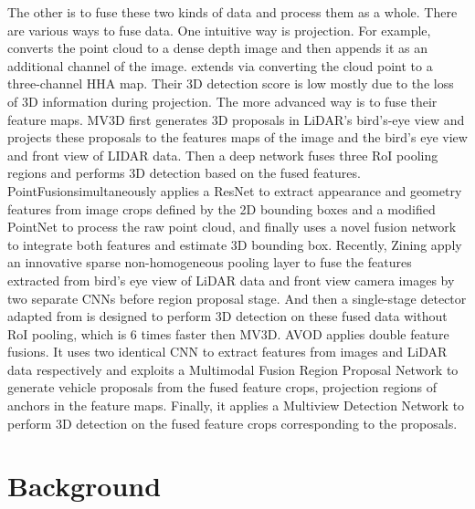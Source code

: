 \documentclass[a4paper,12pt]{article}
\begin{document}
The other is to fuse these two kinds of data and process them as a whole. There are various ways to fuse data. One intuitive way is projection. For example, \cite{DBLP:journals/corr/EitelSSRB15} converts the point cloud to a dense depth image and then appends it as an additional channel of the image. \cite{7487370} extends \cite{DBLP:journals/corr/EitelSSRB15} via converting the cloud point to a three-channel HHA map. Their 3D detection score is low mostly due to the loss of 3D information during projection. The more advanced way is to fuse their feature maps. MV3D \cite{DBLP:journals/corr/ChenMWLX16} first generates 3D proposals in LiDAR's bird's-eye view and projects these proposals to the features maps of the image and the bird’s eye view and front view of LIDAR data. Then a deep network fuses three RoI pooling regions and performs 3D detection based on the fused features. PointFusion\cite{DBLP:journals/corr/abs-1711-10871}simultaneously applies a ResNet \cite{DBLP:journals/corr/HeZRS15} to extract appearance and geometry features from image crops defined by the 2D bounding boxes and a modified PointNet \cite{DBLP:journals/corr/QiSMG16} to process the raw point cloud, and finally uses a novel fusion network to integrate both features and estimate 3D bounding box. Recently, Zining \etal \cite{DBLP:journals/corr/abs-1711-06703} apply an innovative sparse non-homogeneous pooling layer to fuse the features extracted from bird’s eye view of LiDAR data and front view camera images by two separate CNNs before region proposal stage. And then a single-stage detector adapted from \cite{DBLP:journals/corr/abs-1708-02002} is designed to perform 3D detection on these fused data without RoI pooling, which is 6 times faster then MV3D. AVOD \cite{DBLP:journals/corr/abs-1712-02294} applies double feature fusions.  It uses two identical CNN to extract features from images and LiDAR data respectively and exploits a Multimodal Fusion Region Proposal Network to generate vehicle proposals from the fused feature crops, projection regions of anchors in the feature maps. Finally, it applies a Multiview Detection Network to perform 3D detection on the fused feature crops corresponding to the proposals. %





\clearpage

\section{Background}
\label{background}
\end{document}
